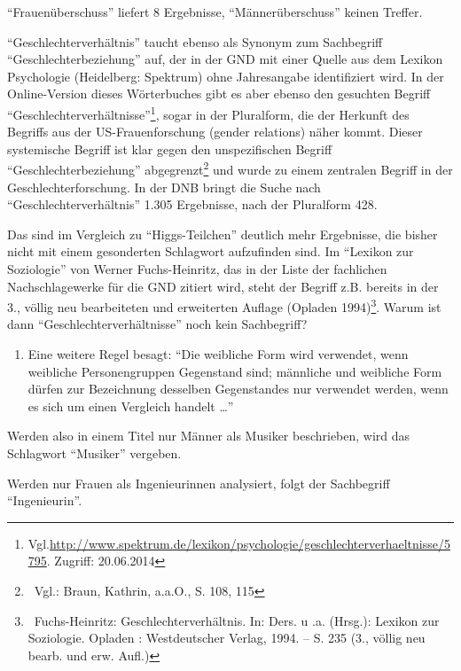 \documentclass[a4paper,
fontsize=11pt,
oneside,
numbers=noperiodatend,
parskip=half-,
bibliography=totoc,
final
]{scrartcl}
\begin{document}
\enquote{Frauenüberschuss} liefert 8 Ergebnisse,
\enquote{Männerüberschuss} keinen Treffer.

\enquote{Geschlechterverhältnis} taucht ebenso als Synonym zum
Sachbegriff \enquote{Geschlechterbeziehung} auf, der in der GND mit
einer Quelle aus dem Lexikon Psychologie (Heidelberg: Spektrum) ohne
Jahresangabe identifiziert wird. In der Online-Version dieses
Wörterbuches gibt es aber ebenso den gesuchten Begriff
\enquote{Geschlechterverhältnisse}\footnote{Vgl.\url{http://www.spektrum.de/lexikon/psychologie/geschlechterverhaeltnisse/5795}.
  Zugriff: 20.06.2014}, sogar in der Pluralform, die der Herkunft des
Begriffs aus der US-Frauenforschung (gender relations) näher kommt.
Dieser systemische Begriff ist klar gegen den unspezifischen Begriff
\enquote{Geschlechterbeziehung} abgegrenzt\footnote{~Vgl.: Braun,
  Kathrin, a.a.O., S. 108, 115} und wurde zu einem zentralen Begriff in
der Geschlechterforschung. In der DNB bringt die Suche nach
\enquote{Geschlechterverhältnis} 1.305 Ergebnisse, nach der Pluralform
428.

Das sind im Vergleich zu \enquote{Higgs-Teilchen} deutlich mehr
Ergebnisse, die bisher nicht mit einem gesonderten Schlagwort
aufzufinden sind. Im \enquote{Lexikon zur Soziologie} von Werner
Fuchs-Heinritz, das in der Liste der fachlichen Nachschlagewerke für die
GND zitiert wird, steht der Begriff z.B. bereits in der 3., völlig neu
bearbeiteten und erweiterten Auflage (Opladen 1994)\footnote{~Fuchs-Heinritz:
  Geschlechterverhältnis. In: Ders. u .a. (Hrsg.): Lexikon zur
  Soziologie. Opladen : Westdeutscher Verlag, 1994. -- S. 235 (3.,
  völlig neu bearb. und erw. Aufl.)}. Warum ist dann
\enquote{Geschlechterverhältnisse} noch kein Sachbegriff?

\begin{enumerate}
\def\labelenumi{\arabic{enumi}.}
\setcounter{enumi}{1}
\itemsep1pt\parskip0pt
\item
  Eine weitere Regel besagt: \enquote{Die weibliche Form wird verwendet,
  wenn weibliche Personengruppen Gegenstand sind; männliche und
  weibliche Form dürfen zur Bezeichnung desselben Gegenstandes nur
  verwendet werden, wenn es sich um einen Vergleich handelt \ldots{}}
\end{enumerate}

Werden also in einem Titel nur Männer als Musiker beschrieben, wird das
Schlagwort \enquote{Musiker} vergeben.

Werden nur Frauen als Ingenieurinnen analysiert, folgt der Sachbegriff
\enquote{Ingenieurin}.
\end{document}
